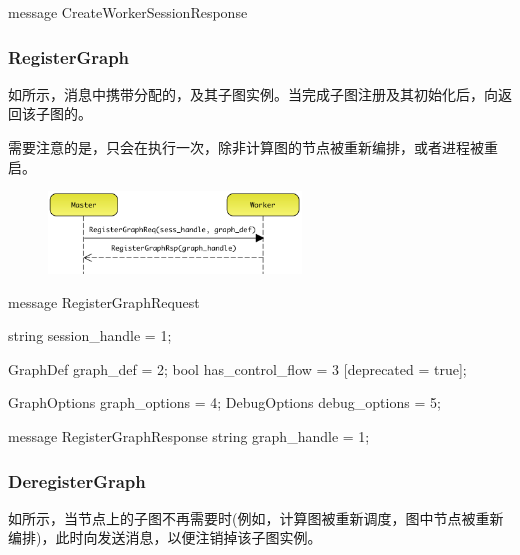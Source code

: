\begin{content}
\begin{leftbar}
\begin{c++}
message CreateWorkerSessionResponse {
}
\end{c++}
\end{leftbar}

\subsubsection{RegisterGraph}

如所示，消息中携带分配的，及其子图实例。当完成子图注册及其初始化后，向返回该子图的。

需要注意的是，只会在执行一次，除非计算图的节点被重新编排，或者进程被重启。

\begin{figure}[H]
\centering
\includegraphics[width=0.6\textwidth]{figures/dist-worker-register-graph.png}
\caption{}
 \label{fig:dist-worker-register-graph}
\end{figure}

\begin{leftbar}
\begin{c++}
message RegisterGraphRequest {
  string session_handle = 1;

  GraphDef graph_def = 2;
  bool has_control_flow = 3 [deprecated = true];

  GraphOptions graph_options = 4;
  DebugOptions debug_options = 5;
}

message RegisterGraphResponse {
  string graph_handle = 1;
}
\end{c++}
\end{leftbar}


\subsubsection{DeregisterGraph}

如所示，当节点上的子图不再需要时(例如，计算图被重新调度，图中节点被重新编排)，此时向发送消息，以便注销掉该子图实例。


\end{content}
